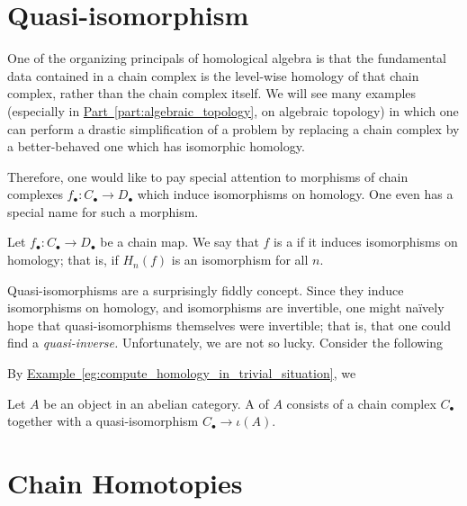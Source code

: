 \documentclass[main.tex]{subfiles}
\begin{document}
\section{Quasi-isomorphism}
\label{sec:quasi_isomorphism}

One of the organizing principals of homological algebra is that the fundamental data contained in a chain complex is the level-wise homology of that chain complex, rather than the chain complex itself. We will see many examples (especially in \hyperref[part:algebraic_topology]{Part~\ref*{part:algebraic_topology}}, on algebraic topology) in which one can perform a drastic simplification of a problem by replacing a chain complex by a better-behaved one which has isomorphic homology.

Therefore, one would like to pay special attention to morphisms of chain complexes $f_{\bullet}\colon C_{\bullet} \to D_{\bullet}$ which induce isomorphisms on homology. One even has a special name for such a morphism.

\begin{definition}
  \label{def:quasi_isomorphism}
  Let $f_{\bullet}\colon C_{\bullet} \to D_{\bullet}$ be a chain map. We say that $f$ is a  if it induces isomorphisms on homology; that is, if $H_{n}(f)$ is an isomorphism for all $n$.
\end{definition}

Quasi-isomorphisms are a surprisingly fiddly concept. Since they induce isomorphisms on homology, and isomorphisms are invertible, one might naïvely hope that quasi-isomorphisms themselves were invertible; that is, that one could find a \emph{quasi-inverse.} Unfortunately, we are not so lucky. Consider the following

By \hyperref[eg:compute_homology_in_trivial_situation]{Example~\ref*{eg:compute_homology_in_trivial_situation}}, we

\begin{definition}[resolution]
  \label{def:resolution}
  Let $A$ be an object in an abelian category. A  of $A$ consists of a chain complex $C_{\bullet}$ together with a quasi-isomorphism $C_{\bullet} \to \iota(A)$.
\end{definition}


\section{Chain Homotopies}
\label{sec:chain_homotopies}
\end{document}
